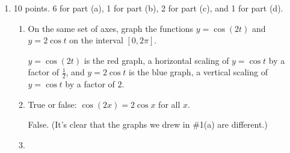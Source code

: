 \documentclass{article}
\begin{document}
\begin{enumerate}[topsep=0pt]
\item 

\begin{grading}
10 points. 6 for part (a), 1 for part (b), 2 for part (c), and 1 for part (d). 
\end{grading}

  \begin{enumerate}
  \item
\begin{problem}
      On the same set of axes, graph the functions $y=\cos (2t)$ and $y=2 \cos
      t$ on the interval $[0, 2 \pi]$.  
    \end{problem}


    \begin{solution}
      $y=\cos(2t)$ is the red graph, a horizontal scaling of $y = \cos t$ by a
      factor of $\frac{1}{2}$, and $y=2 \cos t$ is the blue graph, a vertical
      scaling of $y = \cos t$ by a factor of $2$.
    \end{solution}

  \item
    \begin{problem}[\stretch{0.5}]
      True or false: $\cos(2x) = 2 \cos x$ for all $x$.
    \end{problem}

    \begin{solution}
      False.  (It's clear that the graphs we drew in
      {{{{\#1}}(a)}} are different.)
    \end{solution}

  \item


\end{enumerate}
\end{enumerate}
\end{document}
